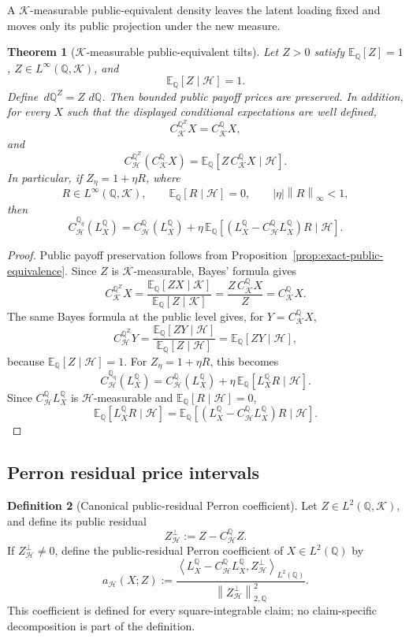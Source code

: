 \documentclass[11pt,a4paper]{amsart}
\theoremstyle{plain}
\newtheorem{theorem}{Theorem}[section]
\theoremstyle{definition}
\newtheorem{definition}[theorem]{Definition}
\theoremstyle{remark}
\newcommand{\QQ}{\mathbb{Q}}
\newcommand{\EE}{\mathbb{E}}
\newcommand{\cH}{\mathcal{H}}
\newcommand{\cK}{\mathcal{K}}
\newcommand{\dd}{\,d}
\newcommand{\norm}[1]{\left\lVert #1\right\rVert}
\newcommand{\ip}[2]{\left\langle #1,#2\right\rangle}
\begin{document}
A \(\cK\)-measurable public-equivalent density leaves the latent loading fixed and moves only its
public projection under the new measure.

\begin{theorem}[\(\cK\)-measurable public-equivalent tilts]\label{thm:k-measurable-tilts}
Let \(Z>0\) satisfy \(\EE_\QQ[Z]=1\), \(Z\in L^\infty(\QQ,\cK)\), and
\[
        \EE_\QQ[Z\mid\cH]=1.
\]
Define \(\dd\QQ^Z=Z\,\dd\QQ\).  Then bounded public payoff prices are preserved.  In addition, for
every \(X\) such that the displayed conditional expectations are well defined,
\[
        C_{\cK}^{\QQ^Z}X
        =
        C_{\cK}^{\QQ}X,
\]
and
\[
        C_{\cH}^{\QQ^Z}\!\left(C_{\cK}^{\QQ}X\right)
        =
        \EE_\QQ\!\left[Z\,C_{\cK}^{\QQ}X\mid\cH\right].
\]
In particular, if \(Z_\eta=1+\eta R\), where
\[
        R\in L^\infty(\QQ,\cK),
        \qquad
        \EE_\QQ[R\mid\cH]=0,
        \qquad
        |\eta|\norm{R}_\infty<1,
\]
then
\[
        C_{\cH}^{\QQ_\eta}(L_X^\QQ)
        =
        C_{\cH}^{\QQ}(L_X^\QQ)
        +
        \eta\,
        \EE_\QQ\!\left[
        (L_X^\QQ-C_{\cH}^{\QQ}L_X^\QQ)R
        \mid\cH
        \right].
\]
\end{theorem}

\begin{proof}
Public payoff preservation follows from Proposition~\ref{prop:exact-public-equivalence}.  Since
\(Z\) is \(\cK\)-measurable, Bayes' formula gives
\[
        C_{\cK}^{\QQ^Z}X
        =
        \frac{\EE_\QQ[ZX\mid\cK]}{\EE_\QQ[Z\mid\cK]}
        =
        \frac{Z\,C_{\cK}^{\QQ}X}{Z}
        =
        C_{\cK}^{\QQ}X.
\]
The same Bayes formula at the public level gives, for \(Y=C_{\cK}^{\QQ}X\),
\[
        C_{\cH}^{\QQ^Z}Y
        =
        \frac{\EE_\QQ[ZY\mid\cH]}{\EE_\QQ[Z\mid\cH]}
        =
        \EE_\QQ[ZY\mid\cH],
\]
because \(\EE_\QQ[Z\mid\cH]=1\).
For \(Z_\eta=1+\eta R\), this becomes
\[
        C_{\cH}^{\QQ_\eta}(L_X^\QQ)
        =
        C_{\cH}^{\QQ}(L_X^\QQ)
        +
        \eta\,\EE_\QQ[L_X^\QQ R\mid\cH].
\]
Since \(C_{\cH}^{\QQ}L_X^\QQ\) is \(\cH\)-measurable and
\(\EE_\QQ[R\mid\cH]=0\),
\[
        \EE_\QQ[L_X^\QQ R\mid\cH]
        =
        \EE_\QQ[(L_X^\QQ-C_{\cH}^{\QQ}L_X^\QQ)R\mid\cH].
\]
\end{proof}

\subsection{Perron residual price intervals}

\begin{definition}[Canonical public-residual Perron coefficient]\label{def:perron-exposed-claim}
Let \(Z\in L^2(\QQ,\cK)\), and define its public residual
\[
        Z_{\cH}^{\perp}:=Z-C_{\cH}^{\QQ}Z.
\]
If \(Z_{\cH}^{\perp}\ne0\), define the public-residual Perron coefficient of \(X\in L^2(\QQ)\) by
\[
        a_{\cH}(X;Z)
        :=
        \frac{
        \ip{L_X^\QQ-C_{\cH}^{\QQ}L_X^\QQ}{Z_{\cH}^{\perp}}_{L^2(\QQ)}
        }{
        \norm{Z_{\cH}^{\perp}}_{2,\QQ}^{2}
        }.
\]
This coefficient is defined for every square-integrable claim; no claim-specific decomposition is
part of the definition.
\end{definition}
\end{document}
